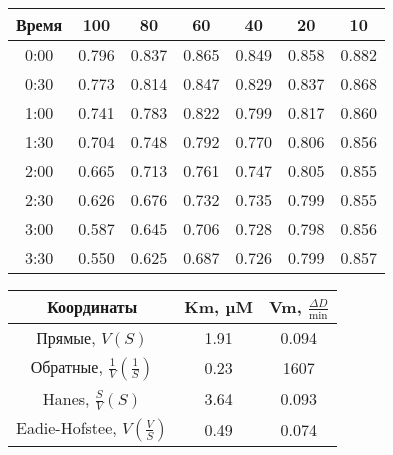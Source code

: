 \begin{tabular}{|c|c|c|c|c|c|c|}
\hline
Время & 100   &  80   &   60  & 40   & 20   &  10  \\
\hline
0:00  & 0.796 & 0.837 & 0.865 &0.849 &0.858 &0.882 \\
0:30  & 0.773 & 0.814 & 0.847 &0.829 &0.837 &0.868 \\
1:00  & 0.741 & 0.783 & 0.822 &0.799 &0.817 &0.860 \\
1:30  & 0.704 & 0.748 & 0.792 &0.770 &0.806 &0.856 \\
2:00  & 0.665 & 0.713 & 0.761 &0.747 &0.805 &0.855 \\
2:30  & 0.626 & 0.676 & 0.732 &0.735 &0.799 &0.855 \\
3:00  & 0.587 & 0.645 & 0.706 &0.728 &0.798 &0.856 \\
3:30  & 0.550 & 0.625 & 0.687 &0.726 &0.799 &0.857 \\
\hline
\end{tabular}

\begin{tabular}{|c|c|c|}
\hline
Координаты & Km, µM & Vm, $\frac{\Delta D}{\text{min}}$ \\
\hline
Прямые, $V(S)$ & 1.91 & 0.094 \\
Обратные, $\frac{1}{V}(\frac{1}{S})$ & 0.23 & 1607 \\
Hanes, $\frac{S}{V}(S)$ & 3.64 & 0.093 \\
Eadie-Hofstee, $V(\frac{V}{S})$ & 0.49 & 0.074 \\
\hline
\end{tabular}









